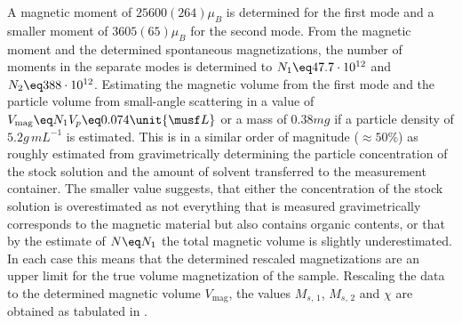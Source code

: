 \documentclass[\main/dresen_thesis.tex]{subfiles}
\begin{document}
  A magnetic moment of $25600(264) \mu_B$ is determined for the first mode and a smaller moment of $3605(65) \mu_B$ for the second mode.
  From the magnetic moment and the determined spontaneous magnetizations, the number of moments in the separate modes is determined to $N_1 \eq 47.7 \cdot 10^{12}$ and $N_2 \eq 388 \cdot 10^{12}$.
  Estimating the magnetic volume from the first mode and the particle volume from small-angle scattering in  a value of $V_\mathrm{mag} \eq N_1 V_p \eq 0.074 \unit{\musf L}$ or a mass of $0.38 \unit{mg}$ if a particle density of $5.2 \unit{g \, mL^{-1}}$ is estimated.
  This is in a similar order of magnitude ($\approx 50\%$) as roughly estimated from gravimetrically determining the particle concentration of the stock solution and the amount of solvent transferred to the measurement container.
  The smaller value suggests, that either the concentration of the stock solution is overestimated as not everything that is measured gravimetrically corresponds to the magnetic material but also contains organic contents, or that by the estimate of $N\eq N_1$ the total magnetic volume is slightly underestimated.
  In each case this means that the determined rescaled magnetizations are an upper limit for the true volume magnetization of the sample.
  Rescaling the data to the determined magnetic volume $V_\mathrm{mag}$, the values $M_{s,\,1}$, $M_{s,\,2}$ and $\chi$ are obtained as tabulated in .
\end{document}
